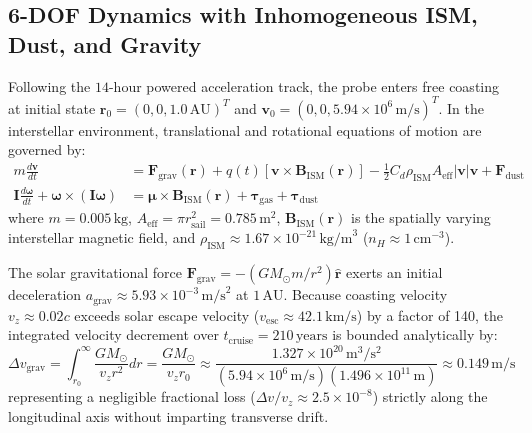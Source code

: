 \documentclass[11pt, a4paper]{article}
\begin{document}
\subsection{6-DOF Dynamics with Inhomogeneous ISM, Dust, and Gravity}
Following the $14$-hour powered acceleration track, the probe enters free coasting at initial state $\mathbf{r}_0 = (0, 0, 1.0\,\text{AU})^T$ and $\mathbf{v}_0 = (0, 0, 5.94 \times 10^6\,\text{m/s})^T$. In the interstellar environment, translational and rotational equations of motion are governed by:
\begin{align}
    m \frac{d\mathbf{v}}{dt} &= \mathbf{F}_{\text{grav}}(\mathbf{r}) + q(t) \left[ \mathbf{v} \times \mathbf{B}_{\text{ISM}}(\mathbf{r}) \right] - \frac{1}{2} C_d \rho_{\text{ISM}} A_{\text{eff}} |\mathbf{v}|\mathbf{v} + \mathbf{F}_{\text{dust}} \\
    \mathbf{I} \frac{d\boldsymbol{\omega}}{dt} + \boldsymbol{\omega} \times (\mathbf{I}\boldsymbol{\omega}) &= \boldsymbol{\mu} \times \mathbf{B}_{\text{ISM}}(\mathbf{r}) + \boldsymbol{\tau}_{\text{gas}} + \boldsymbol{\tau}_{\text{dust}}
\end{align}
where $m = 0.005\,\text{kg}$, $A_{\text{eff}} = \pi r_{\text{sail}}^2 = 0.785\,\text{m}^2$, $\mathbf{B}_{\text{ISM}}(\mathbf{r})$ is the spatially varying interstellar magnetic field, and $\rho_{\text{ISM}} \approx 1.67 \times 10^{-21}\,\text{kg/m}^3$ ($n_H \approx 1\,\text{cm}^{-3}$). 

The solar gravitational force $\mathbf{F}_{\text{grav}} = - (G M_{\odot} m / r^2) \hat{\mathbf{r}}$ exerts an initial deceleration $a_{\text{grav}} \approx 5.93 \times 10^{-3}\,\text{m/s}^2$ at $1\,\text{AU}$. Because coasting velocity $v_z \approx 0.02c$ exceeds solar escape velocity ($v_{\text{esc}} \approx 42.1\,\text{km/s}$) by a factor of 140, the integrated velocity decrement over $t_{\text{cruise}} = 210\,\text{years}$ is bounded analytically by:
\begin{equation}
    \Delta v_{\text{grav}} = \int_{r_0}^{\infty} \frac{G M_{\odot}}{v_z r^2} dr = \frac{G M_{\odot}}{v_z r_0} \approx \frac{1.327 \times 10^{20}\,\text{m}^3/\text{s}^2}{(5.94 \times 10^6\,\text{m/s})(1.496 \times 10^{11}\,\text{m})} \approx 0.149\,\text{m/s}
\end{equation}
representing a negligible fractional loss ($\Delta v / v_z \approx 2.5 \times 10^{-8}$) strictly along the longitudinal axis without imparting transverse drift.
\end{document}
